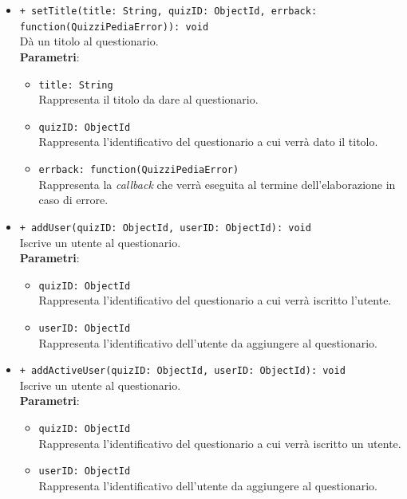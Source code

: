\begin{itemize}
\begin{itemize}
			\item \texttt{+ setTitle(title: String, quizID: ObjectId,  errback: function(QuizziPediaError)): void}\\ 		
			Dà un titolo al questionario.\\
			\textbf{Parametri}:
			\begin{itemize}
				\item \texttt{title: String}\\
				Rappresenta il titolo da dare al questionario.
				\item \texttt{quizID: ObjectId}\\
				Rappresenta l'identificativo del questionario a cui verrà dato il titolo.
				\item \texttt{errback: function(QuizziPediaError)}\\
				Rappresenta la \textit{callback} che verrà eseguita al termine dell'elaborazione in caso di errore.
			\end{itemize}
			
			\item \texttt{+ addUser(quizID: ObjectId, userID: ObjectId): void}\\
			Iscrive un utente al questionario.\\
			\textbf{Parametri}:
			\begin{itemize}
				\item \texttt{quizID: ObjectId}\\
				Rappresenta l'identificativo del questionario a cui verrà iscritto l'utente.
				\item \texttt{userID: ObjectId}\\
				Rappresenta l'identificativo dell'utente da aggiungere al questionario.
			\end{itemize}
			
			\item \texttt{+ addActiveUser(quizID: ObjectId, userID: ObjectId): void}\\
			Iscrive un utente al questionario.\\
			\textbf{Parametri}:
			\begin{itemize}
				\item \texttt{quizID: ObjectId}\\
				Rappresenta l'identificativo del questionario a cui verrà iscritto un utente.
				\item \texttt{userID: ObjectId}\\
				Rappresenta l'identificativo dell'utente da aggiungere al questionario.
			\end{itemize}
			

\end{itemize}
\end{itemize}
